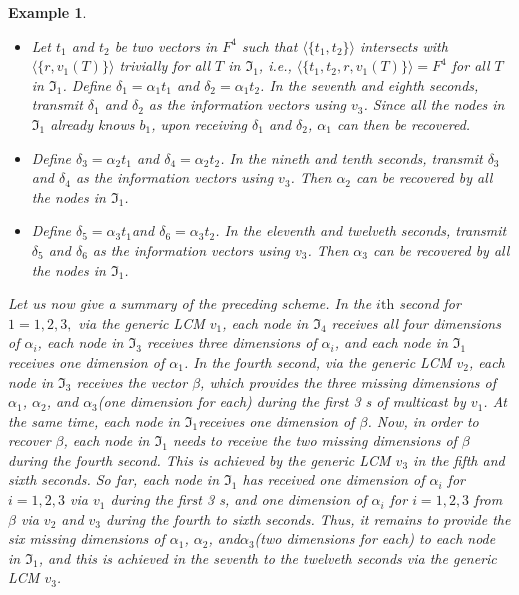 \documentclass[journal]{IEEEtran}
\newtheorem{exam}[prop]{Example}
\begin{document}
\begin{exam}
\begin{itemize}
		\item[d)] Let $t_1$ and $t_2$ be two vectors in $F^4$ such that $\langle \{t_1,t_2\}\rangle$ intersects with $\langle \{r,v_1(T)\}\rangle$ trivially for all $T$ in $\Im_1$, i.e., $\langle \{t_1,t_2,r, v_1(T)\}\rangle = F^4$ for all $T$ in $\Im_1$. Define $\delta_1=\alpha_1t_1$ and $\delta_2=\alpha_1t_2$. In the seventh and eighth seconds, transmit $\delta_1$ and $\delta_2$ as the information vectors using $v_3$. Since all the nodes in $\Im_1$ already knows $b_1$, upon receiving $\delta_1$ and $\delta_2$, $\alpha_1$ can then be recovered.
		\item[e)] Define $\delta_3=\alpha_2t_1$ and $\delta_4=\alpha_2t_2$. In the nineth and tenth seconds, transmit $\delta_3$ and $\delta_4$ as the information vectors using $v_3$. Then $\alpha_2$ can be recovered by all the nodes in $\Im_1$.
		\item[f)] Define $\delta_5=\alpha_3t_1$and $\delta_6=\alpha_3t_2$. In the eleventh and twelveth seconds, transmit $\delta_5$ and $\delta_6$ as the information vectors using $v_3$. Then $\alpha_3$ can be recovered by all the nodes in $\Im_1$.
	\end{itemize}
Let us now give a summary of the preceding scheme. In the $i\text{th}$ second for $1=1,2,3,$ via the generic LCM $v_1$, each node in $\Im_4$ receives all four dimensions of $\alpha_i$, each node in $\Im_3$ receives three dimensions of $\alpha_i$, and each node in $\Im_1$ receives one dimension of $\alpha_1$. In the fourth second, via the generic LCM $v_2$, each node in $\Im_3$ receives the vector $\beta$, which provides the three missing dimensions of $\alpha_1$, $\alpha_2$, and $\alpha_3$(one dimension for each) during the first 3 s of multicast by $v_1$. At the same time, each node in $\Im_1$receives one dimension of $\beta$. Now, in order to recover $\beta$, each node in $\Im_1$ needs to receive the two missing dimensions of $\beta$ during the fourth second. This is achieved by the generic LCM $v_3$ in the fifth and sixth seconds. So far, each node in $\Im_1$ has received one dimension of $\alpha_i$ for $i=1,2,3$ via $v_1$ during the first 3 s, and one dimension of $\alpha_i$ for $i=1,2,3$ from $\beta$ via $v_2$ and $v_3$ during the fourth to sixth seconds. Thus, it remains to provide the six missing dimensions of $\alpha_1$, $\alpha_2$, and$\alpha_3$(two dimensions for each) to each node in $\Im_1$, and this is achieved in the seventh to the twelveth seconds via the generic LCM $v_3$.
\end{exam}
\end{document}
